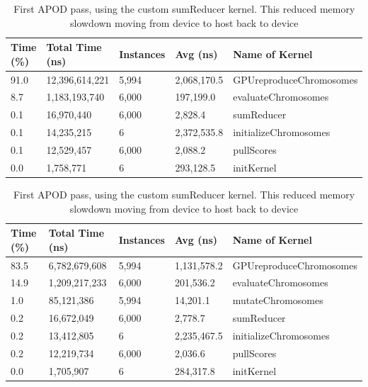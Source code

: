 \documentclass[11pt]{article}       %
\begin{document}
\begin{table}[]
\begin{subtable}[t]{\textwidth}
\begin{tabular}{@{}lllll@{}}
\toprule
Time (\%) & Total Time (ns) & Instances & Avg (ns)  & Name of Kernel          \\ \midrule
91.0      & 12,396,614,221     & 5,994     & 2,068,170.5 & GPUreproduceChromosomes \\
8.7       & 1,183,193,740      & 6,000     & 197,199.0  & evaluateChromosomes     \\
0.1       & 16,970,440      & 6,000     & 2,828.4  & sumReducer              \\
0.1       & 14,235,215      & 6     & 2,372,535.8   & initializeChromosomes      \\
0.1       & 12,529,457       & 6,000        & 2,088.2 & pullScores   \\
0.0      & 1,758,771       & 6         & 293,128.5 & initKernel              \\ \bottomrule
\end{tabular}
\caption{First APOD pass, using the custom sumReducer kernel. This reduced memory slowdown moving from device to host back to device}
\label{tab:first_nsys}
\end{subtable}
\newline
\vspace*{1 cm}
\newline
\begin{subtable}[t]{\textwidth}
\begin{tabular}{@{}lllll@{}}
\toprule
Time (\%) & Total Time (ns) & Instances & Avg (ns)  & Name of Kernel          \\ \midrule
83.5      & 6,782,679,608     & 5,994     & 1,131,578.2  & GPUreproduceChromosomes \\
14.9       & 1,209,217,233       & 6,000     & 201,536.2  & evaluateChromosomes     \\
1.0       & 85,121,386       & 5,994     & 14,201.1   & mutateChromosomes     \\
0.2       & 16,672,049      & 6,000     & 2,778.7  & sumReducer              \\
0.2       & 13,412,805      & 6     & 2,235,467.5   & initializeChromosomes                  \\
0.2       & 12,219,734       & 6,000        & 2,036.6 & pullScores   \\
0.0       & 1,705,907       & 6         & 284,317.8 & initKernel              \\ \bottomrule

\end{tabular}
\end{subtable}
\end{table}
\end{document}
